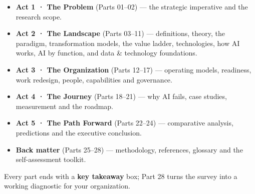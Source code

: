 \begin{itemize}
  \item \textbf{Act 1 · The Problem} (Parts 01--02) — the strategic
        imperative and the research scope.
  \item \textbf{Act 2 · The Landscape} (Parts 03--11) — definitions, theory,
        the paradigm, transformation models, the value ladder, technologies,
        how AI works, AI by function, and data \& technology foundations.
  \item \textbf{Act 3 · The Organization} (Parts 12--17) — operating models,
        readiness, work redesign, people, capabilities and governance.
  \item \textbf{Act 4 · The Journey} (Parts 18--21) — why AI fails, case
        studies, measurement and the roadmap.
  \item \textbf{Act 5 · The Path Forward} (Parts 22--24) — comparative
        analysis, predictions and the executive conclusion.
  \item \textbf{Back matter} (Parts 25--28) — methodology, references,
        glossary and the self-assessment toolkit.
\end{itemize}

Every part ends with a \textbf{key takeaway} box; Part 28 turns the survey
into a working diagnostic for your organization.

